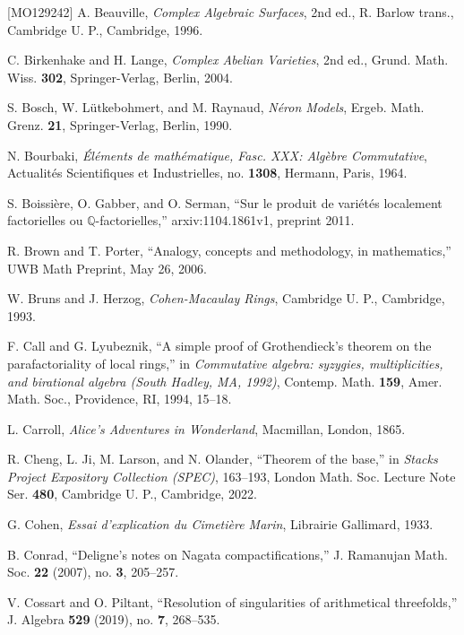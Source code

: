\begin{thebibliography}{[MO129242]}
A. Beauville, \emph{Complex Algebraic Surfaces}, 2nd ed., R. Barlow trans.,
Cambridge U. P., Cambridge, 1996.

C. Birkenhake and H. Lange, \emph{Complex Abelian Varieties}, 2nd ed., Grund.
Math. Wiss. \textbf{302}, Springer-Verlag, Berlin, 2004.

S. Bosch, W. Lütkebohmert, and M. Raynaud, \emph{Néron Models}, Ergeb. Math.
Grenz. \textbf{21}, Springer-Verlag, Berlin, 1990.

N. Bourbaki, \emph{Éléments de mathématique, Fasc. XXX: Algèbre Commutative},
Actualités Scientifiques et Industrielles, no. \textbf{1308}, Hermann, Paris,
1964.

S. Boissière, O. Gabber, and O. Serman, ``Sur le produit de variétés
localement factorielles ou $\mathbb{Q}$-factorielles,'' arxiv:1104.1861v1,
preprint 2011.

R. Brown and T. Porter, ``Analogy, concepts and methodology, in mathematics,''
UWB Math Preprint, May 26, 2006.

W. Bruns and J. Herzog, \emph{Cohen-Macaulay Rings}, Cambridge U. P.,
Cambridge, 1993.

F. Call and G. Lyubeznik, ``A simple proof of Grothendieck's theorem on the
parafactoriality of local rings,'' in \emph{Commutative algebra: syzygies,
multiplicities, and birational algebra (South Hadley, MA, 1992)}, Contemp.
Math. \textbf{159}, Amer. Math. Soc., Providence, RI, 1994, 15--18.

L. Carroll, \emph{Alice's Adventures in Wonderland}, Macmillan, London, 1865.

R. Cheng, L. Ji, M. Larson, and N. Olander, ``Theorem of the base,'' in
\emph{Stacks Project Expository Collection (SPEC)}, 163--193, London Math.
Soc. Lecture Note Ser. \textbf{480}, Cambridge U. P., Cambridge, 2022.

G. Cohen, \emph{Essai d'explication du Cimetière Marin}, Librairie Gallimard,
1933.

B. Conrad, ``Deligne's notes on Nagata compactifications,'' J. Ramanujan Math.
Soc. \textbf{22} (2007), no. \textbf{3}, 205--257.

V. Cossart and O. Piltant, ``Resolution of singularities of arithmetical
threefolds,'' J. Algebra \textbf{529} (2019), no. \textbf{7}, 268--535.


\end{thebibliography}
